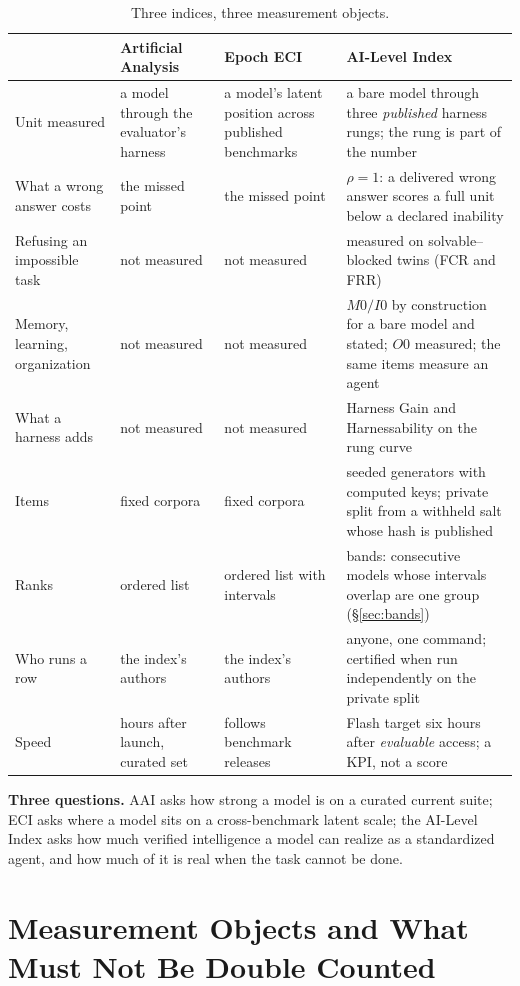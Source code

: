 \begin{table}[!htbp]
\centering\small
\begin{tabularx}{\textwidth}{@{}p{3.1cm} Y Y Y@{}}
\toprule
 & Artificial Analysis & Epoch ECI & AI-Level Index \\
\midrule
Unit measured & a model through the evaluator's harness & a model's latent position across published benchmarks & a bare model through three \emph{published} harness rungs; the rung is part of the number \\
What a wrong answer costs & the missed point & the missed point & $\rho = 1$: a delivered wrong answer scores a full unit below a declared inability \\
Refusing an impossible task & not measured & not measured & measured on solvable--blocked twins (FCR and FRR) \\
Memory, learning, organization & not measured & not measured & $M0/I0$ by construction for a bare model and stated; $O0$ measured; the same items measure an agent \\
What a harness adds & not measured & not measured & Harness Gain and Harnessability on the rung curve \\
Items & fixed corpora & fixed corpora & seeded generators with computed keys; private split from a withheld salt whose hash is published \\
Ranks & ordered list & ordered list with intervals & bands: consecutive models whose intervals overlap are one group (\S\ref{sec:bands}) \\
Who runs a row & the index's authors & the index's authors & anyone, one command; certified when run independently on the private split \\
Speed & hours after launch, curated set & follows benchmark releases & Flash target six hours after \emph{evaluable} access; a KPI, not a score \\
\bottomrule
\end{tabularx}
\caption{Three indices, three measurement objects.}
\label{tab:related}
\end{table}

\textbf{Three questions.} AAI asks how strong a model is on a curated current suite; ECI asks where a model sits on a cross-benchmark latent scale; the AI-Level Index asks how much verified intelligence a model can realize as a standardized agent, and how much of it is real when the task cannot be done.

\section{Measurement Objects and What Must Not Be Double Counted}\label{sec:objects}

